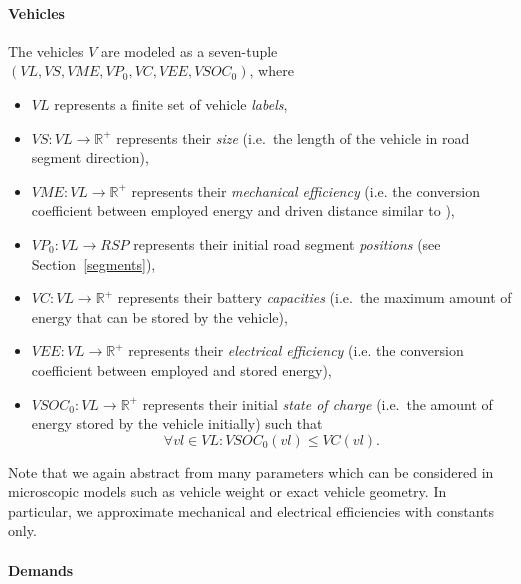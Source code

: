 \paragraph{Vehicles}
\label{vehicles}

The vehicles $V$ are modeled as a seven-tuple $(VL, VS, VME, VP_0, VC, VEE, VSOC_0)$, where
\begin{itemize}
	\item $VL$ represents a finite set of vehicle \textit{labels},
	\item $VS: VL \rightarrow \mathbb{R}^+$ represents their \textit{size} (i.e.\ the length of the vehicle in road segment direction),
	\item $VME: VL \rightarrow \mathbb{R}^+$ represents their \textit{mechanical efficiency} (i.e. the conversion coefficient between employed energy and driven distance similar to \cite{gao2007modeling}),
	\item $VP_0: VL \rightarrow RSP$ represents their initial road segment \textit{positions} (see Section~\ref{segments}),
	\item $VC: VL \rightarrow \mathbb{R}^+$ represents their battery \textit{capacities} (i.e.\ the maximum amount of energy that can be stored by the vehicle),
	\item $VEE: VL \rightarrow \mathbb{R}^+$ represents their \textit{electrical efficiency} (i.e. the conversion coefficient between employed and stored energy),
	\item $VSOC_0: VL \rightarrow \mathbb{R}^+$ represents their initial \textit{state of charge} (i.e.\ the amount of energy stored by the vehicle initially) such that
	\[
		\forall vl \in VL : VSOC_0(vl) \leq VC(vl) \textrm{.}
	\]
\end{itemize}
Note that we again abstract from many parameters which can be considered in microscopic models \cite{gao2007modeling} such as vehicle weight or exact vehicle geometry. In particular, we approximate mechanical and electrical efficiencies with constants only.

\paragraph{Demands}
\label{demands}


